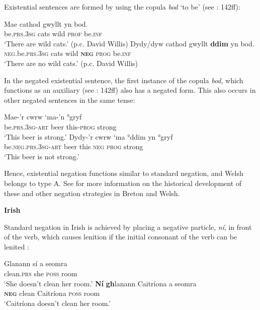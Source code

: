 ﻿\documentclass[output=paper]{langsci/langscibook}
\begin{document}
\begin{unindented}
Existential sentences are formed by using the copula \textit{bod} `to be' (see \citealt{King2003}: 142ff):
%
\begin{exe}\ex \gll Mae cathod  gwyllt  yn  bod.  \\
be.\textsc{prs.3sg}  cats  wild  \textsc{prof}  be.\textsc{inf} \\
    \glt `There are wild cats.' (p.c. David Willis)
\ex \gll Dydy/dyw cathod  gwyllt  \textbf{ddim}  yn   bod.  \\
\textsc{neg}.be.\textsc{prs.3sg}  cats  wild  \textbf{\textsc{neg}}  \textsc{prog}  be.\textsc{inf} \\
    \glt `There are no wild cats.' (p.c. David Willis)
    \end{exe}

In the negated existential sentence, the first instance of the copula \textit{bod}, which functions as an auxiliary (see \citealt{King2003}: 142ff) also has a negated form. This also occurs in other negated sentences in the same tense:
%
\begin{exe}\ex \gll Mae-’r cwrw `ma-'n     °gryf \\
be.\textsc{prs.3sg-art} beer    this-\textsc{prog} strong \\
    \glt `This beer is strong.' \citep[146]{King2003}
\ex \gll Dydy-’r cwrw ‘ma °ddim yn   °gryf \\
be.\textsc{neg.prs.3sg-art} beer this \textsc{neg} \textsc{prog} strong \\
    \glt `This beer is not strong.' \citep[146]{King2003}
    \end{exe}

Hence, existential negation functions similar to standard negation, and Welsh belongs to type A. See \citet{Willis2013} for more information on the historical development of these and other negation strategies in Breton and Welsh. 

\textbf{Irish}

Standard negation in Irish is achieved by placing a negative particle, \textit{ní}, in front of the verb, which causes lenition if the initial consonant of the verb can be lenited \citep[86]{Stenson2008}:
%
\begin{exe}\ex \gll Glanann  sí a seomra \\
clean.\textsc{prs} she \textsc{poss} room \\
    \glt `She doesn't clean her room.' \citet[86]{Stenson2008}
\ex \gll \textbf{Ní} \textbf{gh}lanann Caitríona a seomra \\
\textbf{\textsc{neg}} clean Caitríona \textsc{poss} room \\
    \glt `Caitríona doesn't clean her room.' \citet[86]{Stenson2008}
    \end{exe}


\end{unindented}
\end{document}
